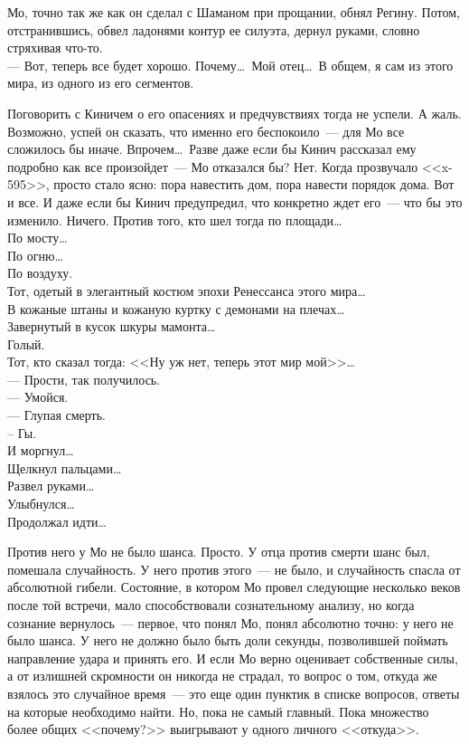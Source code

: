 Мо, точно так же как он сделал с Шаманом при прощании, обнял Регину. Потом, 
отстранившись, обвел ладонями контур ее силуэта, дернул руками, словно 
стряхивая что-то.\\
--- Вот, теперь все будет хорошо. Почему\ldots\ Мой отец\ldots\ В общем, я сам из 
этого мира, из одного из его сегментов.


Поговорить с Киничем о его опасениях и предчувствиях тогда не успели. А жаль. 
Возможно, успей он сказать, что именно его беспокоило~--- для Мо все сложилось 
бы иначе. Впрочем\ldots\ Разве даже если бы Кинич рассказал ему подробно как все 
произойдет~--- Мо отказался бы? Нет. Когда прозвучало <<x-595>>, просто стало 
ясно: пора навестить дом, пора навести порядок дома. Вот и все. И даже если бы Кинич 
предупредил, что конкретно ждет его~--- что бы это изменило. Ничего. Против 
того, кто шел тогда по площади\ldots\\
По мосту\ldots\\
По огню\ldots\\
По воздуху.\\
Тот, одетый в элегантный костюм эпохи Ренессанса этого мира\ldots\\
В кожаные штаны и кожаную куртку с демонами на плечах\ldots\\
Завернутый в кусок шкуры мамонта\ldots\\
Голый.\\
Тот, кто сказал тогда: <<Ну уж нет, теперь этот мир мой>>\ldots\\
--- Прости, так получилось.\\
--- Умойся.\\
--- Глупая смерть.\\
-- Гы.\\
И моргнул\ldots\\
Щелкнул пальцами\ldots\\
Развел руками\ldots\\
Улыбнулся\ldots\\
Продолжал идти\ldots

Против него у Мо не было шанса. Просто. У отца против смерти шанс был, помешала 
случайность. У него против этого~--- не было, и случайность спасла от 
абсолютной гибели. Состояние, в котором Мо провел следующие несколько веков после той 
встречи, мало способствовали сознательному анализу, но когда сознание 
вернулось~--- первое, что понял Мо, понял абсолютно точно: у него не было шанса. У него не 
должно было быть доли секунды, позволившей поймать направление удара и принять 
его. И если Мо верно оценивает собственные силы, а от излишней скромности он 
никогда не страдал, то вопрос о том, откуда же взялось это случайное время~--- 
это еще один пунктик в списке вопросов, ответы на которые необходимо найти. Но, 
пока не самый главный. Пока множество более общих <<почему?>> выигрывают у одного 
личного <<откуда>>.

